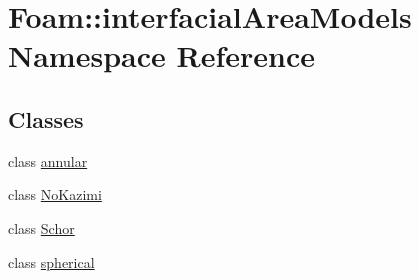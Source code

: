 \hypertarget{namespaceFoam_1_1interfacialAreaModels}{}\section{Foam\+:\+:interfacial\+Area\+Models Namespace Reference}
\label{namespaceFoam_1_1interfacialAreaModels}
\subsection*{Classes}
\begin{DoxyCompactItemize}
\item 
class \hyperlink{classFoam_1_1interfacialAreaModels_1_1annular}{annular}
\item 
class \hyperlink{classFoam_1_1interfacialAreaModels_1_1NoKazimi}{No\+Kazimi}
\item 
class \hyperlink{classFoam_1_1interfacialAreaModels_1_1Schor}{Schor}
\item 
class \hyperlink{classFoam_1_1interfacialAreaModels_1_1spherical}{spherical}
\end{DoxyCompactItemize}
